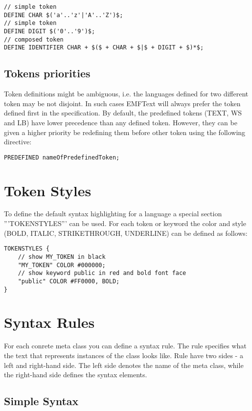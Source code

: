 \begin{lstlisting}
// simple token
DEFINE CHAR $('a'..'z'|'A'..'Z')$;
// simple token
DEFINE DIGIT $('0'..'9')$;
// composed token
DEFINE IDENTIFIER CHAR + $($ + CHAR + $|$ + DIGIT + $)*$;
\end{lstlisting}

\subsection{Tokens priorities}

Token definitions might be ambiguous, i.e. the languages defined for two different 
token may be not disjoint. In such cases EMFText will always prefer the token defined 
first in the specification. By default, the predefined tokens (TEXT, WS and LB) have 
lower precedence than any defined token. However, they can be given a higher priority 
be redefining them before other token using the following directive:

\begin{lstlisting}
PREDEFINED nameOfPredefinedToken;
\end{lstlisting}

\section{Token Styles}

To define the default syntax highlighting for a language a special section '''TOKENSTYLES''' can be used. For each token or keyword the color and style (BOLD, ITALIC, STRIKETHROUGH, UNDERLINE) can be defined as follows:

\begin{lstlisting}
TOKENSTYLES {
    // show MY_TOKEN in black
    "MY_TOKEN" COLOR #000000;
    // show keyword public in red and bold font face
    "public" COLOR #FF0000, BOLD;
}
\end{lstlisting}

\section{Syntax Rules}

For each conrete meta class you can define a syntax rule. The rule specifies what the text that represents instances of the class looks like. Rule have two sides - a left and right-hand side. The left side denotes the name of the meta class, while the right-hand side defines the syntax elements. 

\subsection{Simple Syntax}

